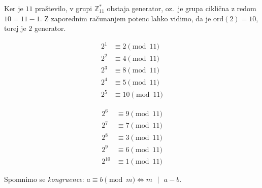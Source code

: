 \documentclass[isrm2, tisk]{fmfdelo}
\newcommand{\Z}{\mathbb Z}
\begin{document}
\begin{primer}[Grupa $\Z_{11}^*$]
Ker je $11$ praštevilo, v grupi $\Z_{11}^*$ obstaja generator, oz.\ je grupa ciklična z redom $10 = 
11 - 1$. Z zaporednim računanjem potenc lahko vidimo, da je $\text{ord}(2) = 10$, torej je $2$ 
generator.

\begin{minipage}{0.45\textwidth}
    \begin{align*}
        2^1 &\equiv 2 \pmod{11} \\
        2^2 &\equiv 4 \pmod{11} \\
        2^3 &\equiv 8 \pmod{11} \\
        2^4 &\equiv 5 \pmod{11} \\
        2^5 &\equiv 10 \pmod{11} 
    \end{align*}
\end{minipage}
\begin{minipage}{0.45\textwidth}
    \begin{align*}
        2^6 &\equiv 9 \pmod{11} \\
        2^7 &\equiv 7 \pmod{11} \\
        2^8 &\equiv 3 \pmod{11} \\
        2^9 &\equiv 6 \pmod{11} \\
        2^{10} &\equiv 1 \pmod{11} 
    \end{align*}
\end{minipage}

\end{primer}

\begin{opomba}
    Spomnimo se \textit{kongruence}: $a \equiv b \pmod m \iff m \text{ }|\text{ } a - b$.
\end{opomba}
\end{document}
